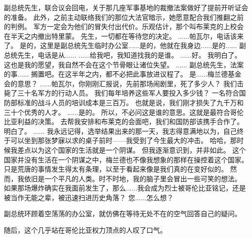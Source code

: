 \documentclass[openany]{book}
\begin{document}
\begin{dialogue}
     副总统先生，联合议会回电，关于那几座军事基地的裁撤法案做好了提前开听证会的准备。
     此外，之前主动联络我们的那位大法官暗示，她愿意配合我们推翻之前的判例。
     军方一定会为他们的冒失付出代价。乐观估计，那个叫布莱克的上校会在半天之内撤出特里蒙。
     先生，一切都在等待您的决定。
     ......帕瓦尔，电话该来了。
     是的，这里是副总统先生临时办公室......是的，他就在我身边......是的......
     副总统先生，电话是从......
     ......给我吧，我知道找我的是谁。
     ......好。
     我明白了。这也是我的愿望，我自然不会在这个节骨眼让诸位失望。
     ......
     副总统先生，法案的事......
     搁置吧。在这半年之内，都不必把此事放进议程了。
     是......梅兰德基金会的意思？
     ......帕瓦尔，你刚刚汇报说，先前那场闹剧里，死了多少人？
     我们击毙了三十名军方的行动人员。
     我们每年培养这些军人要投入多少钱？
     一名符合国防部标准的战斗人员的培训成本是三百万。
     也就是说，我们刚才损失了九千万和三十个优秀的人才。
     ......是的。
     所以，不必问这是谁的意思。这就是最符合哥伦比亚利益的决策。
     去帮我安排和布莱克的会面吧，我们和国防部该携手合作了。
     明白了。
     ......
     我永远记得，选举结果出来的那一天，我志得意满地以为，自己终于可以坐到那张梦寐以求的桌子前时——我受到了今生最大的冲击。
     哈哈，那时候我差点以为这个国家的生活就是一个阴谋。
     但我逐渐意识到，并非如此。
     这个国家并没有生活在一个阴谋之中，梅兰德也不像我想象的那样在操控着这个国家。
     只是荒唐的事情发生得太有条理，以至于看起来像是我们真的在变好似的。
     然而，我依旧是一个平凡的人类。时不时地，我的脑子里会冒出一些可笑的想法。
     如果那场爆炸确实在我面前发生了，那么......我会成为烈士被哥伦比亚铭记，还是被当作无能之辈，被迅速扫进历史角落？
     您......怎么想？
\end{dialogue}\par

副总统环顾着空荡荡的办公室，就仿佛在等待无处不在的空气回答自己的疑问。\par
随后，这个几乎站在哥伦比亚权力顶点的人叹了口气。
\end{document}
